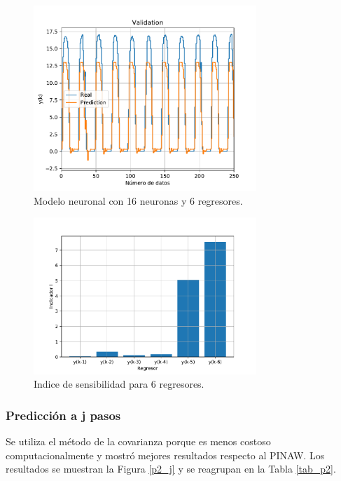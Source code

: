 \documentclass[12pt]{article}
\begin{document}
\begin{figure}[h!]
	\centering
	\captionsetup{justification=centering}
	 \includegraphics[width=0.75\textwidth]{imag/redes/model3_p2.pdf}
	\caption{Modelo neuronal con 16 neuronas y 6 regresores.}
	\label{p2_model3}
\end{figure}
\begin{figure}[h!]
	\centering
	\captionsetup{justification=centering}
	 \includegraphics[width=0.75\textwidth]{imag/redes/sensi_p23.pdf}
	\caption{Indice de sensibilidad para 6 regresores.}
	\label{sensi_p2_3}
\end{figure}

\newpage
\clearpage
\subsubsection{Predicción a j pasos}
Se utiliza el método de la covarianza porque es menos costoso computacionalmente y mostró mejores resultados respecto al PINAW. Los resultados se muestran la Figura \ref{p2_j} y se reagrupan en la Tabla \ref{tab_p2}.
\end{document}
